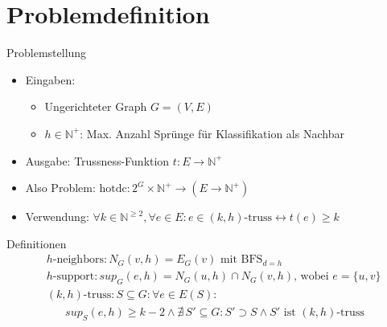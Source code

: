 \section{Problemdefinition}

\begin{frame}{Problemstellung}
    \begin{itemize}
        \item Eingaben:
        \begin{itemize}
            \item Ungerichteter Graph $G = (V,E)$
            \item $h \in \mathbb{N}^+$: Max. Anzahl Sprünge für Klassifikation als Nachbar
        \end{itemize}
        \item Ausgabe: Trussness-Funktion $t: E \rightarrow \mathbb{N}^+$
        \item Also Problem: $\text{hotdc}: 2^G \times \mathbb{N}^+ \rightarrow (E \rightarrow \mathbb{N}^+)$
        \item Verwendung: $\forall k \in \mathbb{N}^{\geq 2}, \forall e \in E: e \in \text{$(k,h)$-truss} \leftrightarrow t(e) \geq k$
    \end{itemize}
\end{frame}

\begin{frame}{Definitionen}
    \begin{align*}
        &\hspace{0pt} \text{$h$-neighbors}: N_G(v,h) = E_G(v) \text{ mit BFS}_{d=h}  \\
        &\hspace{0pt} \text{$h$-support}: sup_G(e, h) = N_G(u,h) \cap N_G(v,h) \text{, wobei } e = \{u,v\} \\
        &\hspace{0pt} \text{$(k,h)$-truss}: S \subseteq G: \forall e \in E(S): \\
        &\hspace{20pt} sup_{S}(e,h) \geq k - 2 \land \nexists \, S' \subseteq G: S' \supset S \land S' \text{ ist } \text{$(k,h)$-truss} \\
    \end{align*}
\end{frame}
